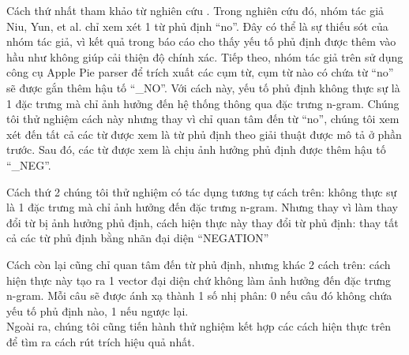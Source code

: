 Cách thứ nhất tham khảo từ nghiên cứu \cite{niu2005analysis}. Trong nghiên cứu đó, nhóm tác giả Niu, Yun, et al. chỉ xem xét 1 từ phủ định ``no''. Đây có thể là sự thiếu sót của nhóm tác giả, vì kết quả trong báo cáo \cite{niu2005analysis} cho thấy yếu tố phủ định được thêm vào hầu như không giúp cải thiện độ chính xác. Tiếp theo, nhóm tác giả trên sử dụng công cụ Apple Pie parser để trích xuất các cụm từ, cụm từ nào có chứa từ ``no'' sẽ được gắn thêm hậu tố ``\_NO''. Với cách này, yếu tố phủ định không thực sự là 1 đặc trưng mà chỉ ảnh hưởng đến hệ thống thông qua đặc trưng n-gram. Chúng tôi thử nghiệm cách này nhưng thay vì chỉ quan tâm đến từ ``no'', chúng tôi xem xét đến tất cả các từ được xem là từ phủ định theo giải thuật được mô tả ở phần trước. Sau đó, các từ được xem là chịu ảnh hưởng phủ định được thêm hậu tố ``\_NEG''.


Cách thứ 2 chúng tôi thử nghiệm có tác dụng tương tự cách trên: không thực sự là 1 đặc trưng mà chỉ ảnh hưởng đến đặc trưng n-gram. Nhưng thay vì làm thay đổi từ bị ảnh hưởng phủ định, cách hiện thực này thay  đổi từ phủ định: thay tất cả các từ phủ định bằng nhãn đại diện ``NEGATION''\\


Cách còn lại cũng chỉ quan tâm đến từ phủ định, nhưng khác 2 cách trên: cách hiện thực này tạo ra 1 vector đại diện chứ không làm ảnh hưởng đến đặc trưng n-gram. Mỗi câu sẽ được ánh xạ thành 1 số nhị phân: 0 nếu câu đó không chứa yếu tố phủ định nào, 1 nếu ngược lại.\\

Ngoài ra, chúng tôi cũng tiến hành thử nghiệm kết hợp các cách hiện thực trên để tìm ra cách rút trích hiệu quả nhất.
